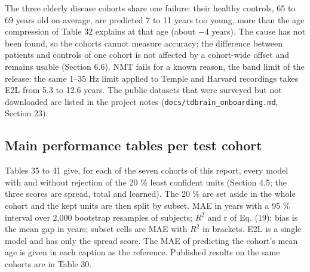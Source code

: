 \documentclass[11pt,a4paper]{article}
\begin{document}
The three elderly disease cohorts share one failure: their healthy controls, 65 to 69 years old on average, are predicted 7 to 11 years too young, more than the age compression of Table 32 explains at that age (about $-$4 years). The cause has not been found, so the cohorts cannot measure accuracy; the difference between patients and controls of one cohort is not affected by a cohort-wide offset and remains usable (Section 6.6). NMT fails for a known reason, the band limit of the release: the same 1--35 Hz limit applied to Temple and Harvard recordings takes E2L from 5.3 to 12.6 years. The public datasets that were surveyed but not downloaded are listed in the project notes (\texttt{docs/tdbrain\_onboarding.md}, Section 23).

\subsection{Main performance tables per test cohort}

Tables 35 to 41 give, for each of the seven cohorts of this report, every model with and without rejection of the 20 \% least confident units (Section 4.5; the three scores are spread, total and learned). The 20 \% are set aside in the whole cohort and the kept units are then split by subset. MAE in years with a 95 \% interval over 2,000 bootstrap resamples of subjects; $R^2$ and r of Eq. (19); bias is the mean gap in years; subset cells are MAE with $R^2$ in brackets. E2L is a single model and has only the spread score. The MAE of predicting the cohort's mean age is given in each caption as the reference. Published results on the same cohorts are in Table 30.
\end{document}
